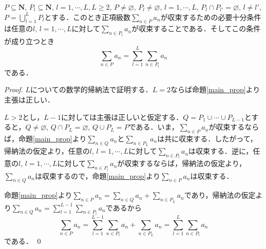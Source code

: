 \documentclass[12pt,a4paper]{jsarticle}
\newcommand{\nat}{\mathbf{N}}
\begin{document}
\begin{corollary}
    $P \subseteq \nat$, $P_l \subseteq \nat$, $l = 1, \cdots, L, L \geq 2$, $P \not= \varnothing$, $P_l \not= \varnothing$, $l = 1, \cdots, L$, $P_l \cap P_{l'} = \varnothing$, $l \not= l'$, $P = \bigcup_{l = 1}^L P_l$とする．このとき正項級数$\sum_{n \in P} a_n$が収束するための必要十分条件は任意の$l$, $l = 1, \cdots, L$に対して$\sum_{n \in P_l} a_n$が収束することである．そしてこの条件が成り立つとき
    \begin{equation*}
        \sum_{n \in P} a_n = \sum_{l = 1}^L \sum_{n \in P_l} a_n
    \end{equation*}
    である．
\end{corollary}
\begin{proof}
    $L$についての数学的帰納法で証明する．$L = 2$ならば命題\ref{main_prop}より主張は正しい．

    $L > 2$とし，$L - 1$に対しては主張は正しいと仮定する．$Q = P_1 \cup \cdots \cup P_{L - 1}$とすると，$Q \not= \varnothing$, $Q \cap P_L = \varnothing$, $Q \cup P_L = P$である．いま，$\sum_{n \in P} a_n$が収束するならば，命題\ref{main_prop}より$\sum_{n \in Q} a_n$と$\sum_{n \in P_L} a_n$は共に収束する．したがって，帰納法の仮定より，任意の$l$, $l = 1, \cdots, L$に対して$\sum_{n \in P_l} a_n$は収束する．逆に，任意の$l$, $l = 1, \cdots, L$に対して$\sum_{n \in P_l} a_n$が収束するならば，帰納法の仮定より，$\sum_{n \in Q} a_n$は収束するので，命題\ref{main_prop}より$\sum_{n \in P} a_n$は収束する．

    命題\ref{main_prop}より$\sum_{n \in P} a_n = \sum_{n \in Q} a_n + \sum_{n \in P_L} a_n$であり，帰納法の仮定より$\sum_{n \in Q} a_n = \sum_{l = 1}^{L - 1} \sum_{n \in P_l} a_n$であるから
    \begin{equation*}
        \sum_{n \in P} a_n = \sum_{l = 1}^{L - 1} \sum_{n \in P_l} a_n + \sum_{n \in P_L} a_n = \sum_{l = 1}^L \sum_{n \in P_l} a_n
    \end{equation*}
    である．
    \qed
\end{proof}
\end{document}
